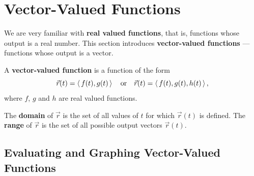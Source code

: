 \section{Vector-Valued Functions}\label{sec:vvf}


We are very familiar with \textbf{real valued functions}, that is, functions whose output is a real number. This section introduces \textbf{vector-valued functions} --- functions whose output is a vector.

\begin{definition}\label{def:vvf}%
A \textbf{vector-valued function} is a function of the form 
\[\vec r(t) =\left\langle \, f(t),g(t)\,\right\rangle\quad \text{or}\quad \vec r(t) =\left\langle \,f(t),g(t),h(t)\,\right\rangle,\]
where $f$, $g$ and $h$ are real valued functions.\bigskip

The \textbf{domain} of $\vec r$ is the set of all values of $t$ for which $\vec r(t)$ is defined. The \textbf{range} of $\vec r$ is the set of all possible output vectors $\vec r(t)$.
\end{definition}

\subsection{Evaluating and Graphing Vector-Valued Functions}

